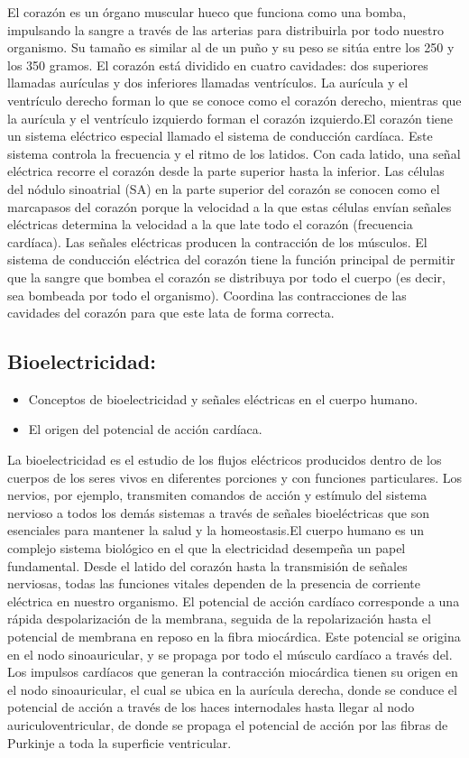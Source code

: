 El corazón es un órgano muscular hueco que funciona como una bomba, impulsando la sangre a través de las arterias para distribuirla por todo nuestro organismo. Su tamaño es similar al de un puño y su peso se sitúa entre los 250 y los 350 gramos. El corazón está dividido en cuatro cavidades: dos superiores llamadas aurículas y dos inferiores llamadas ventrículos. La aurícula y el ventrículo derecho forman lo que se conoce como el corazón derecho, mientras que la aurícula y el ventrículo izquierdo forman el corazón izquierdo.El corazón tiene un sistema eléctrico especial llamado el sistema de conducción cardíaca. Este sistema controla la frecuencia y el ritmo de los latidos. Con cada latido, una señal eléctrica recorre el corazón desde la parte superior hasta la inferior. Las células del nódulo sinoatrial (SA) en la parte superior del corazón se conocen como el marcapasos del corazón porque la velocidad a la que estas células envían señales eléctricas determina la velocidad a la que late todo el corazón (frecuencia cardíaca). Las señales eléctricas producen la contracción de los músculos. El sistema de conducción eléctrica del corazón tiene la función principal de permitir que la sangre que bombea el corazón se distribuya por todo el cuerpo (es decir, sea bombeada por todo el organismo). Coordina las contracciones de las cavidades del corazón para que este lata de forma correcta.

\subsection{Bioelectricidad:}
\begin{itemize}
    \item Conceptos de bioelectricidad y señales eléctricas en el cuerpo humano.
    \item El origen del potencial de acción cardíaca.
\end{itemize}

La bioelectricidad es el estudio de los flujos eléctricos producidos dentro de los cuerpos de los seres vivos en diferentes porciones y con funciones particulares. Los nervios, por ejemplo, transmiten comandos de acción y estímulo del sistema nervioso a todos los demás sistemas a través de señales bioeléctricas que son esenciales para mantener la salud y la homeostasis.El cuerpo humano es un complejo sistema biológico en el que la electricidad desempeña un papel fundamental. Desde el latido del corazón hasta la transmisión de señales nerviosas, todas las funciones vitales dependen de la presencia de corriente eléctrica en nuestro organismo. El potencial de acción cardíaco corresponde a una rápida despolarización de la membrana, seguida de la repolarización hasta el potencial de membrana en reposo en la fibra miocárdica. Este potencial se origina en el nodo sinoauricular, y se propaga por todo el músculo cardíaco a través del. Los impulsos cardíacos que generan la contracción miocárdica tienen su origen en el nodo sinoauricular, el cual se ubica en la aurícula derecha, donde se conduce el potencial de acción a través de los haces internodales hasta llegar al nodo auriculoventricular, de donde se propaga el potencial de acción por las fibras de Purkinje a toda la superficie ventricular.


